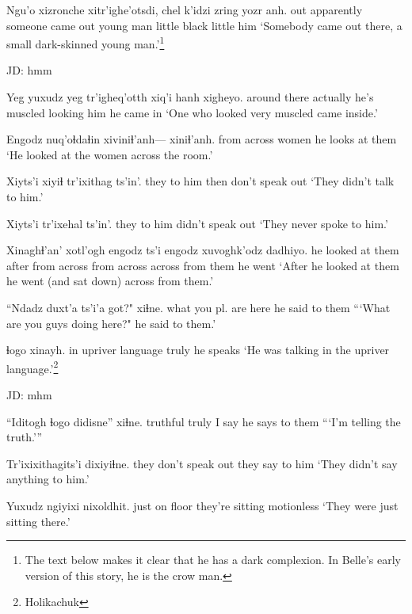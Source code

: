 \documentclass[12pt]{article}
\begin{document}
\gll Ngu'o xizronche xitr'ighe'otsdi, chel      k'idzi zring yozr   anh.
out apparently     {someone came out} {young man} little black little him
\glt `Somebody came out there, a small dark-skinned young man.'\footnote{The text below makes it clear that he has a dark complexion.  In Belle's early version of this story, he is the crow man.}
\glend 

JD:  hmm

\gll Yeg {yuxudz yeg} tr'igheq'otth xiq'i  hanh xigheyo.
{around there} actually    {he's muscled}  looking him  {he came in}
\glt `One who looked very muscled came inside.'
\glend

\gll Engodz      nuq'oɬdaɬin xiviniɬ'anh---  xiniɬ'anh.
{from across} women    {}   {he looks at them}
\glt `He looked at the women across the room.'
\glend

\gll Xiyts'i     xiyiɬ {tr'ixithag      ts'in'}. 
{they to him} then  {don't speak out} 
\glt `They didn't talk to him.'
\glend

\gll Xiyts'i     {tr'ixehal        ts'in'}.
{they to him} {didn't speak out}
\glt `They never spoke to him.'
\glend

\gll Xinaghɬ'an'       xotl'ogh engodz ts'i engodz      xuvoghk'odz      dadhiyo.
{he looked at them} after    {from across} {} {from across} {across from them} {he went}
\glt `After he looked at them he went (and sat down) across from them.'
\glend

\gll ``Ndadz duxt'a       ts'i'a got?" xiɬne.
 what  {you pl. are}  {}      here {he said to them }
\glt ```What are you guys doing here?" he said to them.'
\glend

          ɬogo  xinayh.
{in upriver language} truly {he speaks}
\glt `He was talking in the upriver language.'\footnote{Holikachuk}
\glend 

JD:  mhm

\gll ``Iditogh ɬogo didisne'' xiɬne.
truthful truly {I say} {he says to them}
\glt ```I'm telling the truth.'''
\glend

\gll Tr'ixixithagits'i   dixiyiɬne.
{they don't speak out} {they say to him}
\glt `They didn't say anything to him.'
\glend

\gll Yuxudz ngiyixi nixoldhit.
just  {on floor}    {they're sitting motionless}
\glt `They were just sitting there.'
\glend
\end{document}

